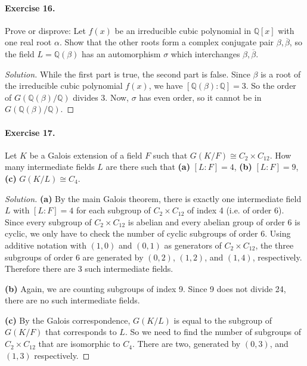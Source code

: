 \documentclass{article}
\newcommand{\Q}{\mathbb Q}
\begin{document}
\paragraph{Exercise 16.} Prove or disprove:
Let $f(x)$ be an irreducible cubic polynomial
in $\Q[x]$ with one real root $\alpha$. Show that the other roots form
a complex conjugate pair $\beta, \overline \beta$, so the field
$L=\Q(\beta)$ has an automorphism $\sigma$ which interchanges
$\beta,\overline \beta$.

\begin{proof}[Solution]
While the first part is true, the second part is false. Since $\beta$
is a root of the irreducible cubic polynomial $f(x)$, we
have $[\Q(\beta):\Q]=3$. So the order of $G(\Q(\beta)/\Q)$ divides
3. Now, $\sigma$ has even order, so it cannot be in $G(\Q(\beta)/\Q)$.
\end{proof}



\paragraph{Exercise 17.} Let $K$ be a Galois extension of a field $F$
such that $G(K/F)\cong C_2\times C_{12}$. How many intermediate fields
$L$ are there such that {\bf(a)} $[L:F]=4$, {\bf(b)} $[L:F]=9$,
{\bf(c)} $G(K/L)\cong C_4$.

\begin{proof}[Solution] \hfill

{\bf(a)}
By the main Galois theorem, there is exactly one intermediate field
$L$ with $[L:F]=4$ for each subgroup of $C_2\times C_{12}$ of index 4
(i.e. of order 6). Since every subgroup of $C_2\times C_{12}$ is
abelian and every abelian group of order 6 is cyclic, we only have to
check the number of cyclic subgroups of order 6. Using additive
notation with $(1,0)$ and $(0,1)$ as generators of  $C_2\times
C_{12}$,
 the three subgroups
of order 6 are generated by $(0,2)$, $(1,2)$, and $(1,4)$,
respectively. Therefore there are 3 such intermediate fields.

{\bf(b)}
Again, we are counting subgroups of index 9. Since 9 does not divide
24, there are no such intermediate fields.

{\bf(c)}
By the Galois correspondence, $G(K/L)$ is equal to the subgroup of
$G(K/F)$ that corresponds to $L$. So we need to find the number of
subgroups of $C_2\times C_{12}$ that are isomorphic to $C_4$. There
are two, generated by $(0,3)$, and $(1,3)$ respectively.
\end{proof}
\end{document}
